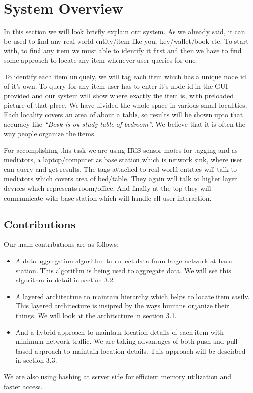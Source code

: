 \documentclass [a4paper,12pt]{book}
\begin{document}
\section{System Overview}

In this section we will look briefly explain our system. As we already said, it can be used to find any real-world entity/item like your key/wallet/book etc. To start with, to find any item we must able to identify it first and then we have to find some approach to locate any item whenever user queries for one. 

To identify each item uniquely, we will tag each item which has a unique node id of it's own. To query for any item user has to enter it's node id in the GUI provided and our system will show where exactly the item is, with preloaded picture of that place. We have divided the whole space in various small localities. Each locality covers an area of about a table, so results will be shown upto that accuracy like {\em``Book is on study table of bedroom''}. We believe that it is often the way people organize the items.

For accomplishing this task we are using IRIS sensor motes for tagging and as mediators, a laptop/computer as base station which is network sink, where user can query and get results. The tags attached to real world entities will talk to mediators which covers area of bed/table. They again will talk to higher layer devices which represents room/office. And finally at the top they will communicate with base station which will handle all user interaction.

\subsection{Contributions}
Our main contributions are as follows:
\begin{itemize}
\item A data aggregation algorithm to collect data from large network at base station. This algorithm is being used to aggregate data. We will see this algorithm in detail in section 3.2.
\item A layered architecture to maintain hierarchy which helps to locate item easily. This layered architecture is insipred by the ways humans organize their things. We will look at the architecture in section 3.1.
\item And a hybrid approach to maintain location details of each item with minimum network traffic. We are taking advantages of both push and pull based approach to maintain location details. This approach will be descirbed in section 3.3.
\end{itemize}
We are also using hashing at server side for efficient memory utilization and faster access.
\end{document}

